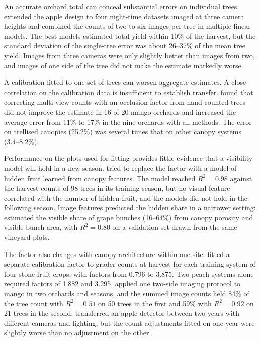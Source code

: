 An accurate orchard total can conceal substantial errors on individual trees. \citet{linker2017procedure} extended the apple design to four night-time datasets imaged at three camera heights and combined the counts of two to six images per tree in multiple linear models. The best models estimated total yield within 10\% of the harvest, but the standard deviation of the single-tree error was about 26--37\% of the mean tree yield. Images from three cameras were only slightly better than images from two, and images of one side of the tree did not make the estimate markedly worse.

A calibration fitted to one set of trees can worsen aggregate estimates. A close correlation on the calibration data is insufficient to establish transfer. \citet{anderson2021estimation} found that correcting multi-view counts with an occlusion factor from hand-counted trees did not improve the estimate in 16 of 20 mango orchards and increased the average error from 11\% to 17\% in the nine orchards with all methods. The error on trellised canopies (25.2\%) was several times that on other canopy systems (3.4--8.2\%).

Performance on the plots used for fitting provides little evidence that a visibility model will hold in a new season. \citet{koirala2021attempting} tried to replace the factor with a model of hidden fruit learned from canopy features. The model reached $R^2=0.98$ against the harvest counts of 98 trees in its training season, but no visual feature correlated with the number of hidden fruit, and the models did not hold in the following season. Image features predicted the hidden share in a narrower setting: \citet{victorino2022overcoming} estimated the visible share of grape bunches (16--64\%) from canopy porosity and visible bunch area, with $R^2=0.80$ on a validation set drawn from the same vineyard plots.

The factor also changes with canopy architecture within one site. \citet{islam2022ground} fitted a separate calibration factor to grader counts at harvest for each training system of four stone-fruit crops, with factors from 0.796 to 3.875. Two peach systems alone required factors of 1.882 and 3.295. \citet{payne2014estimating} applied one two-side imaging protocol to mango in two orchards and seasons, and the summed image counts held 84\% of the tree count with $R^2=0.51$ on 50 trees in the first and 59\% with $R^2=0.92$ on 21 trees in the second. \citet{linker2018machine} transferred an apple detector between two years with different cameras and lighting, but the count adjustments fitted on one year were slightly worse than no adjustment on the other.

